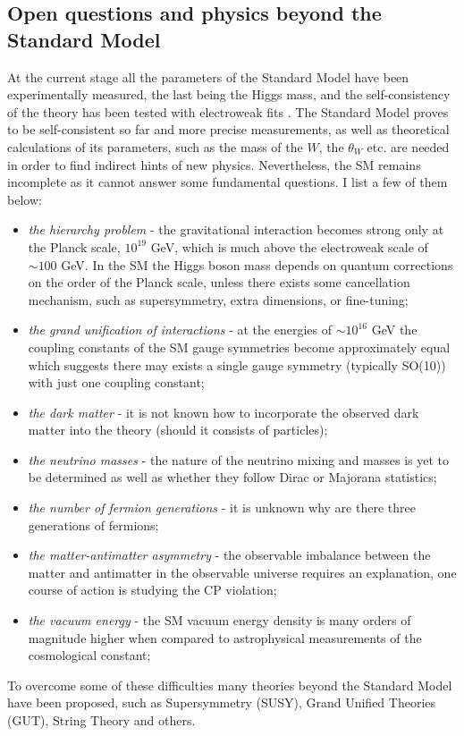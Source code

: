 \subsection{Open questions and physics beyond the Standard Model}

At the current stage all the parameters of the Standard Model have been experimentally measured,
the last being the Higgs mass, and the
self-consistency of the theory has been tested with electroweak fits \cite{Baak:2013ppa}.
The Standard Model proves to be self-consistent so far and more precise measurements,
as well as theoretical calculations of its
parameters, such as the mass of the $W$, 
the $\theta_W$ etc. are needed in order to find indirect hints
of new physics. Nevertheless, the SM remains incomplete as it cannot answer some fundamental 
questions. I list a few of them below:
\begin{itemize}
 \item {\it the hierarchy problem} - the gravitational interaction becomes strong only at the 
Planck scale, $10^{19}$ GeV, which is much above the electroweak scale of $\sim 100$ GeV. 
In the SM the Higgs boson mass 
depends on quantum corrections on the order of the Planck scale, unless there
exists some cancellation mechanism, such as supersymmetry, extra dimensions, or fine-tuning; 
 \item {\it the grand unification of interactions} - at the energies of $\sim 10^{16}$ GeV
the coupling constants of the SM gauge symmetries become approximately equal which suggests
there may exists a single gauge symmetry (typically SO(10)) with just one coupling constant;
 \item {\it the dark matter} - it is not known how to incorporate the observed
 dark matter into the theory (should it consists of particles);
 \item {\it the neutrino masses} - the nature of the neutrino mixing and masses is yet to be
determined as well as whether they follow Dirac or Majorana statistics;
 \item {\it the number of fermion generations} - it is unknown why are there three generations
of fermions;
 \item {\it the matter-antimatter asymmetry} - the observable imbalance between the matter and
antimatter in the observable universe requires an explanation, one course of action is studying
the CP violation; 
 \item {\it the vacuum energy} - the SM vacuum
energy density is many orders of magnitude higher when compared to astrophysical measurements
of the cosmological constant;
\end{itemize}
To overcome some of these difficulties many theories beyond the Standard Model have been
proposed, such as Supersymmetry (SUSY), Grand Unified Theories (GUT), String Theory
and others. 

